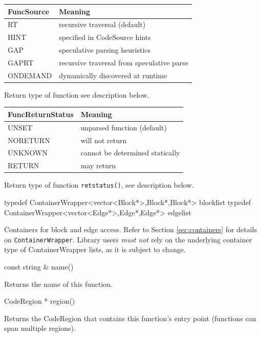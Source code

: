 \documentclass{article}
\newenvironment{apient}{\small\verbatim}{\endverbatim}
\newcommand{\apidesc}[1]{%
{\addtolength{\leftskip}{4em}%
#1\par\medskip}
}
\begin{document}
\begin{center}
\begin{tabular}{ll}
\toprule
FuncSource & Meaning \\
\midrule
RT & recursive traversal (default) \\
HINT & specified in CodeSource hints \\
GAP & speculative parsing heuristics \\
GAPRT & recursive traversal from speculative parse \\
ONDEMAND & dynamically discovered at runtime \\
\bottomrule
\end{tabular}
\end{center}

\apidesc{Return type of function  see description below.}

\begin{center}
\begin{tabular}{ll}
\toprule
FuncReturnStatus & Meaning \\
\midrule
UNSET & unparsed function (default) \\
NORETURN & will not return \\
UNKNOWN & cannot be determined statically \\
RETURN & may return \\
\bottomrule
\end{tabular}
\end{center}

\apidesc{Return type of function \texttt{retstatus()}, see description below.}

\begin{apient}
typedef ContainerWrapper<vector<Block*>,Block*,Block*> blocklist
typedef ContainerWrapper<vector<Edge*>,Edge*,Edge*> edgelist
\end{apient}
\apidesc{Containers for block and edge access. Refer to Section \ref{sec:containers} for details on \texttt{ContainerWrapper}. Library users \emph{must not} rely on the underlying container type of ContainerWrapper lists, as it is subject to change.}

\begin{apient}
const string & name()
\end{apient}
\apidesc{Returns the name of this function.}

\begin{apient}
CodeRegion * region()
\end{apient}
\apidesc{Returns the CodeRegion that contains this function's entry point (functions can span multiple regions).}
\end{document}
